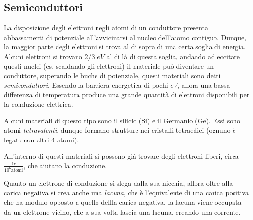 \documentclass{article}
\begin{document}
\subsection{Semiconduttori}
La disposizione degli elettroni negli atomi di un conduttore presenta abbassamenti di potenziale all'avvicinarsi al nucleo dell'atomo contiguo. Dunque, la maggior parte degli elettroni si trova  
al di sopra di una certa soglia di energia. Alcuni elettroni si trovano 2/3 $eV$ al di là di questa soglia,  andando ad eccitare questi nuclei (es. scaldando gli elettroni) il materiale può diventare un conduttore, superando le buche di potenziale, 
questi materiali sono detti \textit{semiconduttori}. Essendo la barriera energetica di pochi $eV$, allora una bassa differenza di temperatura produce una grande quantità di elettroni disponibili per la conduzione elettrica. 

Alcuni materiali di questo tipo sono il silicio (Si) e il Germanio (Ge). Essi sono atomi \textit{tetravalenti}, dunque formano strutture nei cristalli tetraedici (ognuno è legato con altri 4 atomi). 

All'interno di questi materiali si possono già trovare degli elettroni liberi, circa $\frac{1e}{10^6 \text{atomi}}$, che aiutano la conduzione. 

Quanto un elettrone di conduzione si slega dalla sua nicchia, allora oltre alla carica negativa si crea anche una \textit{lacuna}, che è l'equivalente di una carica positiva che ha modulo opposto a quello dellla carica negativa.
la lacuna viene occupata da un elettrone vicino, che a sua volta lascia una lacuna, creando una corrente.
\end{document}

